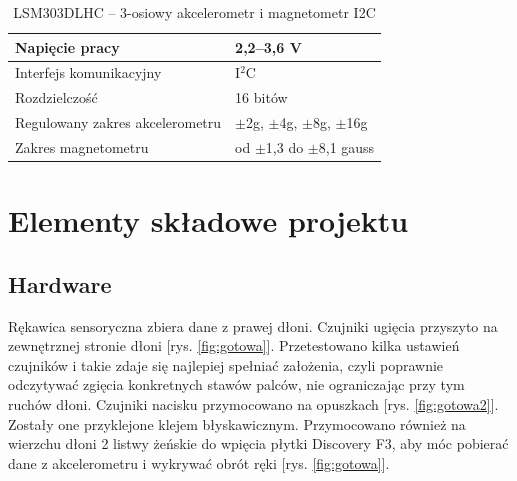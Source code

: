 \documentclass[12pt,a4paper]{article}
\begin{document}
\begin{table}[!htb]
\centering
\begin{tabularx}
{\textwidth}{ |X|X| }
\hline
Napięcie pracy & 2,2--3,6 V \\
\hline
Interfejs komunikacyjny & I$^2$C \\
\hline
Rozdzielczość & 16 bitów \\
\hline
Regulowany zakres akcelerometru &  $\pm$2g, $\pm$4g, $\pm$8g, $\pm$16g \\ 
\hline
Zakres magnetometru &  od $\pm$1,3 do $\pm$8,1 gauss \\ 
\hline
\end{tabularx}
\caption{LSM303DLHC -- 3-osiowy akcelerometr i magnetometr I2C}
\label{table:tabela_akcelerometr}
\end{table}

\section{Elementy składowe projektu}

\subsection{Hardware}
Rękawica sensoryczna zbiera dane z prawej dłoni. Czujniki ugięcia przyszyto na zewnętrznej stronie dłoni [rys. \ref{fig:gotowa}].
 Przetestowano kilka ustawień czujników i takie zdaje się najlepiej spełniać założenia, czyli poprawnie odczytywać zgięcia konkretnych stawów palców, nie ograniczając przy tym ruchów dłoni. Czujniki nacisku przymocowano na opuszkach [rys. \ref{fig:gotowa2}]. Zostały one przyklejone klejem błyskawicznym. Przymocowano również na wierzchu dłoni 2 listwy żeńskie do wpięcia płytki Discovery F3, aby móc pobierać dane z akcelerometru i wykrywać obrót ręki [rys. \ref{fig:gotowa}].
 
\end{document}
